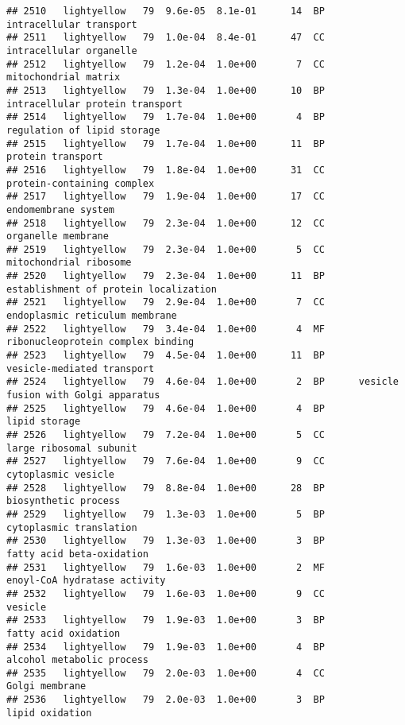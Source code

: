\documentclass[]{article}
\begin{document}
\begin{verbatim}
## 2510   lightyellow   79  9.6e-05  8.1e-01      14  BP                  intracellular transport
## 2511   lightyellow   79  1.0e-04  8.4e-01      47  CC                  intracellular organelle
## 2512   lightyellow   79  1.2e-04  1.0e+00       7  CC                     mitochondrial matrix
## 2513   lightyellow   79  1.3e-04  1.0e+00      10  BP          intracellular protein transport
## 2514   lightyellow   79  1.7e-04  1.0e+00       4  BP              regulation of lipid storage
## 2515   lightyellow   79  1.7e-04  1.0e+00      11  BP                        protein transport
## 2516   lightyellow   79  1.8e-04  1.0e+00      31  CC               protein-containing complex
## 2517   lightyellow   79  1.9e-04  1.0e+00      17  CC                      endomembrane system
## 2518   lightyellow   79  2.3e-04  1.0e+00      12  CC                       organelle membrane
## 2519   lightyellow   79  2.3e-04  1.0e+00       5  CC                   mitochondrial ribosome
## 2520   lightyellow   79  2.3e-04  1.0e+00      11  BP    establishment of protein localization
## 2521   lightyellow   79  2.9e-04  1.0e+00       7  CC           endoplasmic reticulum membrane
## 2522   lightyellow   79  3.4e-04  1.0e+00       4  MF        ribonucleoprotein complex binding
## 2523   lightyellow   79  4.5e-04  1.0e+00      11  BP               vesicle-mediated transport
## 2524   lightyellow   79  4.6e-04  1.0e+00       2  BP      vesicle fusion with Golgi apparatus
## 2525   lightyellow   79  4.6e-04  1.0e+00       4  BP                            lipid storage
## 2526   lightyellow   79  7.2e-04  1.0e+00       5  CC                  large ribosomal subunit
## 2527   lightyellow   79  7.6e-04  1.0e+00       9  CC                      cytoplasmic vesicle
## 2528   lightyellow   79  8.8e-04  1.0e+00      28  BP                     biosynthetic process
## 2529   lightyellow   79  1.3e-03  1.0e+00       5  BP                  cytoplasmic translation
## 2530   lightyellow   79  1.3e-03  1.0e+00       3  BP                fatty acid beta-oxidation
## 2531   lightyellow   79  1.6e-03  1.0e+00       2  MF             enoyl-CoA hydratase activity
## 2532   lightyellow   79  1.6e-03  1.0e+00       9  CC                                  vesicle
## 2533   lightyellow   79  1.9e-03  1.0e+00       3  BP                     fatty acid oxidation
## 2534   lightyellow   79  1.9e-03  1.0e+00       4  BP                alcohol metabolic process
## 2535   lightyellow   79  2.0e-03  1.0e+00       4  CC                           Golgi membrane
## 2536   lightyellow   79  2.0e-03  1.0e+00       3  BP                          lipid oxidation

\end{verbatim}
\end{document}
